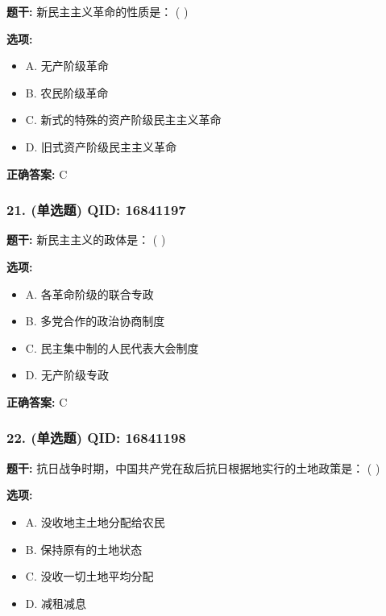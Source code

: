 \documentclass[12pt,UTF8]{ctexart}
\begin{document}
\textbf{题干:}
新民主主义革命的性质是： ( )

\textbf{选项:}
\begin{itemize}[leftmargin=*]

  \item A. 无产阶级革命

  \item B. 农民阶级革命

  \item C. 新式的特殊的资产阶级民主主义革命

  \item D. 旧式资产阶级民主主义革命

\end{itemize}

\textbf{正确答案:}
C

\vspace{0.3em}\hrulefill\vspace{0.7em}

\subsubsection*{21. (单选题) \small QID: 16841197}

\textbf{题干:}
新民主主义的政体是： ( )

\textbf{选项:}
\begin{itemize}[leftmargin=*]

  \item A. 各革命阶级的联合专政

  \item B. 多党合作的政治协商制度

  \item C. 民主集中制的人民代表大会制度

  \item D. 无产阶级专政

\end{itemize}

\textbf{正确答案:}
C

\vspace{0.3em}\hrulefill\vspace{0.7em}

\subsubsection*{22. (单选题) \small QID: 16841198}

\textbf{题干:}
抗日战争时期，中国共产党在敌后抗日根据地实行的土地政策是： ( )

\textbf{选项:}
\begin{itemize}[leftmargin=*]

  \item A. 没收地主土地分配给农民

  \item B. 保持原有的土地状态

  \item C. 没收一切土地平均分配

  \item D. 减租减息

\end{itemize}
\end{document}
